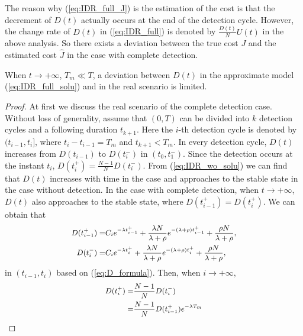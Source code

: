 The reason why (\ref{eq:IDR_full_J}) is the estimation of the cost
is that the decrement of $D(t)$ actually occurs
at the end of the detection cycle.
However, the change rate of $D(t)$ in (\ref{eq:IDR_full})
is denoted by $\frac{D(t)}{N}U(t)$ in the above analysis.
So there exists a deviation between the true cost $J$ and
the estimated cost $\hat{J}$ in the case with complete detection.
\begin{lem}\label{lem:Dstable}
When $t \rightarrow +\infty$, $T_{m} \ll T$,
a deviation between $D(t)$ 
in the approximate model (\ref{eq:IDR_full_solu})
and in the real scenario is limited.
\end{lem}
\begin{proof}
At first we discuss the real scenario of the complete detection case.
Without loss of generality,
assume that $(0, T)$ can be divided into $k$ detection cycles
and a following duration $t_{k+1}$.
Here the $i$-th detection cycle is denoted by $(t_{i-1}, t_{i}]$,
where $t_{i} - t_{i-1} = T_{m}$ and $t_{k+1} < T_{m}$.
In every detection cycle,
$D(t)$ increases from $D(t_{i-1})$ to $D(t_{i}^{-})$
in $(t_{0}, t_{1}^{-})$.
Since the detection occurs at the instant $t_{i}$,
$D(t_{i}^{+}) = \frac{N-1}{N}D(t_{i}^{-})$.
From (\ref{eq:IDR_wo_solu}) we can find that $D(t)$ increases with time in the case
and approaches to the stable state in the case without detection.
In the case with complete detection,
when $t \rightarrow +\infty$,
$D(t)$ also approaches to the stable state,
where $D(t_{i-1}^{+}) = D(t_{i}^{+})$.
We can obtain that
\begin{equation}
\begin{small}
\nonumber
\begin{aligned}
D(t_{i-1}^{+}) = & C_{i} e^{-\lambda t_{i-1}^{+}}
+ \frac{\lambda N}{\lambda + \rho} e^{-(\lambda+\rho)t_{i-1}^{+}}
+ \frac{\rho N}{\lambda+\rho}, \\
D(t_{i}^{-}) = & C_{i} e^{-\lambda t_{i}^{+}}
+ \frac{\lambda N}{\lambda + \rho} e^{-(\lambda+\rho)t_{i}^{+}}
+ \frac{\rho N}{\lambda+\rho},
\end{aligned}
\end{small}
\end{equation}
in $(t_{i-1}, t_{i})$ based on (\ref{eq:D_formula}).
Then, when $i \rightarrow +\infty$,
\begin{equation}
\begin{small}
\nonumber
\begin{aligned}
D(t_{i}^{+}) =& \frac{N-1}{N} D(t_{i}^{-}) \\
=& \frac{N-1}{N} D(t_{i-1}^{+}) e^{-\lambda T_{m}}

\end{aligned}
\end{small}
\end{equation}
\end{proof}
